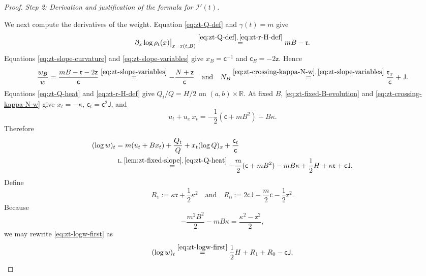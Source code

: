 \documentclass[10pt]{amsart}
\theoremstyle{definition}
\theoremstyle{remark}
\numberwithin{equation}{section}
\newcommand{\R}{\mathbb R}
\newcommand{\1}{\mathbf 1}
\newcommand{\cI}{\mathcal I}
\newcommand{\stackref}[2]{\stackrel{#2}{#1}}
\begin{document}
\begin{proof}
\smallskip
\noindent\emph{Step 2: Derivation and justification of the formula for $\cI'(t)$.}

We next compute the derivatives of the weight. Equation \eqref{eq:zt-Q-def} and $\gamma(t)=m$ give
\begin{equation*}
 \partial_x\log\rho_t(x)\big|_{x=x(t,B)}
 \stackref{=}{\eqref{eq:zt-Q-def},\,\eqref{eq:zt-r-H-def}}
 mB-\mathfrak r.
\end{equation*}
Equations \eqref{eq:zt-slope-curvature} and \eqref{eq:zt-slope-variables} give $x_B=\mathsf c^{-1}$ and $\mathsf c_B=-2\mathsf z$. Hence
\begin{equation}
 \frac{w_B}{w}
 =\frac{mB-\mathfrak r-2\mathsf z}{\mathsf c}
 \stackref{=}{\eqref{eq:zt-slope-variables}}
 -\frac{N+\mathsf z}{\mathsf c}
 \quad\text{and}\quad
 N_B
 \stackref{=}{\eqref{eq:zt-crossing-kappa-N-w},\,\eqref{eq:zt-slope-variables}}
 \frac{\mathfrak r_x}{\mathsf c}+\mathsf J.
 \label{eq:zt-wB-NB}
\end{equation}
Equations \eqref{eq:zt-Q-heat} and \eqref{eq:zt-r-H-def} give $Q_t/Q=H/2$ on $(a,b)\times\R$. At fixed $B$, \eqref{eq:zt-fixed-B-evolution} and \eqref{eq:zt-crossing-kappa-N-w} give $x_t=-\kappa$, $\mathsf c_t=\mathsf c^2\mathsf J$, and
\begin{equation*}
 u_t+u_x\,x_t=-\frac12(\mathsf c+mB^2)-B\kappa.
\end{equation*}
Therefore
\begin{align}
 (\log w)_t
 &=m(u_t+Bx_t)+\frac{Q_t}{Q}
   +x_t(\log Q)_x+\frac{\mathsf c_t}{\mathsf c}                         \notag\\
 &\stackref{=}{\mathrm{L.\,\ref{lem:zt-fixed-slope}},\,\eqref{eq:zt-Q-heat}}
 -\frac m2(\mathsf c+mB^2)-mB\kappa
   +\frac12H+\kappa\mathfrak r+\mathsf c\mathsf J.                            \label{eq:zt-logw-first}
\end{align}
Define
\begin{equation}
 R_1:=\kappa\mathfrak r+\frac12\kappa^2
 \quad\text{and}\quad
 R_0:=2\mathsf c\mathsf J-\frac m2\mathsf c-\frac12\mathsf z^2.
 \label{eq:zt-R1-R0-def}
\end{equation}
Because
\begin{equation*}
 -\frac{m^2B^2}{2}-mB\kappa=\frac{\kappa^2-\mathsf z^2}{2},
\end{equation*}
we may rewrite \eqref{eq:zt-logw-first} as
\begin{equation}
 (\log w)_t
 \stackref{=}{\eqref{eq:zt-logw-first}}
 \frac12H+R_1+R_0-\mathsf c\mathsf J,
 \label{eq:zt-logw-R}
\end{equation}


\end{proof}
\end{document}
